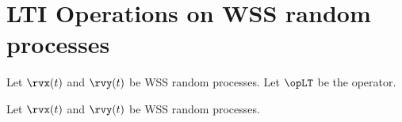 \section{LTI Operations on WSS random processes}
\begin{definition}
\label{def:LSxx}
\label{def:LSyy}
\label{def:LSxy}
\label{def:LSyx}
Let $\rvx(t)$ and $\rvy(t)$ be WSS random processes.
Let $\opLT$ be the  operator.
\end{definition}

\begin{definition}
\label{def:Swxx_ct}
\label{def:Swyy_ct}
\label{def:Swxy_ct}
\label{def:Swyx_ct}
Let $\rvx(t)$ and $\rvy(t)$ be WSS random processes.
\end{definition}

